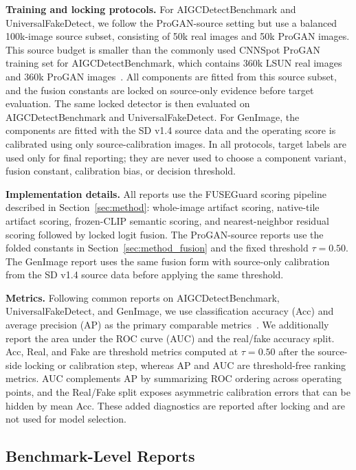 \documentclass[lettersize,journal]{IEEEtran}
\begin{document}
\textbf{Training and locking protocols.}
For AIGCDetectBenchmark and UniversalFakeDetect, we follow the ProGAN-source setting but use a balanced 100k-image source subset, consisting of 50k real images and 50k ProGAN images. This source budget is smaller than the commonly used CNNSpot ProGAN training set for AIGCDetectBenchmark, which contains 360k LSUN real images and 360k ProGAN images~\cite{wang2020cnnspot,zhong2023patchcraft}. All components are fitted from this source subset, and the fusion constants are locked on source-only evidence before target evaluation. The same locked detector is then evaluated on AIGCDetectBenchmark and UniversalFakeDetect. For GenImage, the components are fitted with the SD v1.4 source data and the operating score is calibrated using only source-calibration images. In all protocols, target labels are used only for final reporting; they are never used to choose a component variant, fusion constant, calibration bias, or decision threshold.

\textbf{Implementation details.}
All reports use the FUSEGuard scoring pipeline described in Section~\ref{sec:method}: whole-image artifact scoring, native-tile artifact scoring, frozen-CLIP semantic scoring, and nearest-neighbor residual scoring followed by locked logit fusion. The ProGAN-source reports use the folded constants in Section~\ref{sec:method_fusion} and the fixed threshold $\tau=0.50$. The GenImage report uses the same fusion form with source-only calibration from the SD v1.4 source data before applying the same threshold.

\textbf{Metrics.}
Following common reports on AIGCDetectBenchmark, UniversalFakeDetect, and GenImage, we use classification accuracy (Acc) and average precision (AP) as the primary comparable metrics~\cite{ojha2023univfd,zhong2023patchcraft,zhu2023genimage,yan2025aide}. We additionally report the area under the ROC curve (AUC) and the real/fake accuracy split. Acc, Real, and Fake are threshold metrics computed at $\tau=0.50$ after the source-side locking or calibration step, whereas AP and AUC are threshold-free ranking metrics. AUC complements AP by summarizing ROC ordering across operating points, and the Real/Fake split exposes asymmetric calibration errors that can be hidden by mean Acc. These added diagnostics are reported after locking and are not used for model selection.

\subsection{Benchmark-Level Reports}
\label{sec:benchmark_reports}
\end{document}
